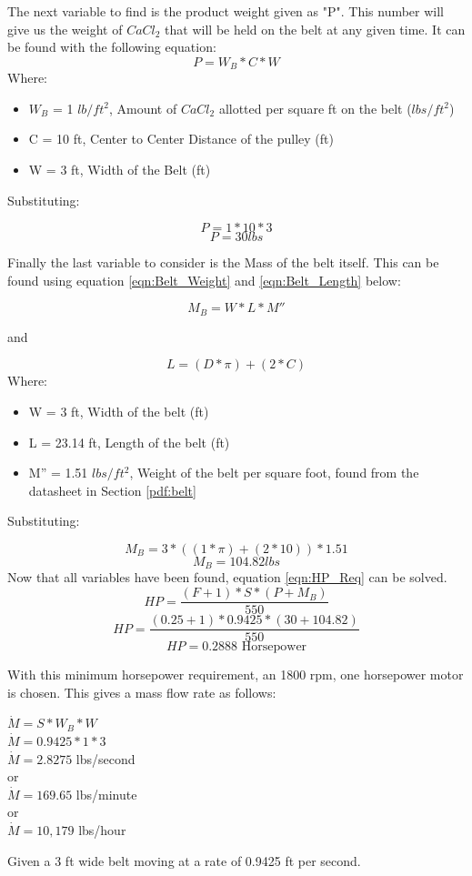 \documentclass[10pt]{project}
\begin{document}
The next variable to find is the product weight given as "P". This number will give us the weight of $CaCl_2$ that will be held on the belt at any given time. It can be found with the following equation:
\begin{equation}
    P = W_B * C * W
\end{equation}
Where:
\begin{itemize}[noitemsep, topsep=0pt]
    \item $W_B$ = 1 $lb/ft^2$, Amount of $CaCl_2$ allotted per square ft on the belt ($lbs/ft^2$)
    \item C = 10 ft, Center to Center Distance of the pulley (ft)
    \item W = 3 ft, Width of the Belt (ft)
\end{itemize}
Substituting:
\begin{center}
    $$P = 1 * 10 * 3$$
    $$P = 30 lbs$$
\end{center}
Finally the last variable to consider is the Mass of the belt itself. This can be found using equation \ref{eqn:Belt_Weight} and \ref{eqn:Belt_Length} below:

\begin{equation} \label{eqn:Belt_Weight}
    M_B = W * L * M''
\end{equation}
\begin{center}
    and
\end{center}
\begin{equation} \label{eqn:Belt_Length}
    L = (D*\pi) + (2*C)
\end{equation}
Where:
\begin{itemize}[noitemsep, topsep=0pt]
    \item W = 3 ft, Width of the belt (ft)
    \item L = 23.14 ft, Length of the belt (ft)
    \item M'' = 1.51 $lbs/ft^2$, Weight of the belt per square foot, found from the datasheet in Section \ref{pdf:belt}
\end{itemize}
Substituting:

$$M_B = 3 * ((1 * \pi)+(2*10)) * 1.51$$
$$M_B = 104.82 lbs$$
Now that all variables have been found, equation \ref{eqn:HP_Req} can be solved.\\
$$HP= \frac{(F+1)*S*(P+M_B)}{550}$$
$$HP= \frac{(0.25+1)*0.9425*(30+104.82)}{550}$$
$$HP= 0.2888 \text{ Horsepower}$$

\noindent With this minimum horsepower requirement, an 1800 rpm, one horsepower motor is chosen. This gives a mass flow rate as follows:
\begin{center}
$\dot M = S * W_B * W$\\
$\dot M = 0.9425 * 1 * 3$\\
$\dot M = 2.8275$ lbs/second\\
or\\
$\dot M = 169.65$ lbs/minute\\
or\\
$\dot M = 10,179$ lbs/hour\\
\end{center}
Given a 3 ft wide belt moving at a rate of 0.9425 ft per second.
\end{document}
